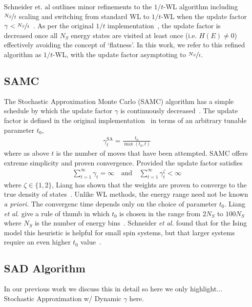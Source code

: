 \documentclass[letterpaper,twocolumn,amsmath,amssymb,pre,aps,10pt]{revtex4-1}
\begin{document}
Schneider $\text{et. al}$ outlines minor refinements to the $1/t$-WL algorithm
including $\nicefrac{N_S}{t}$ scaling and switching from standard WL to
$1/t$-WL when the update factor $\gamma <
\nicefrac{N_S}{t}$~\cite{schneider2017convergence}. As per the original
$1/t$ implementation~\cite{belardinelli2007fast}, the update factor is
decreased once all $N_S$ energy states are visited at least once (i.e.
$H(E) \neq 0$) effectively avoiding the concept of `flatness'.  In this
work, we refer to this refined algorithm as $1/t$-WL, with the update
factor asymptoting to $\nicefrac{N_S}{t}$.

\subsection{SAMC}
The Stochastic Approximation Monte Carlo (SAMC) algorithm has a simple
schedule by which the update factor $\gamma$ is continuously
decreased~\cite{liang2007stochastic, werlich2015stochastic,
schneider2017convergence}.  The update factor is defined in the
original implementation~\cite{liang2007stochastic} in terms of an
arbitrary tunable parameter $t_0$,
\begin{align}
\gamma_{t}^{\text{SA}} =\frac{t_0}{\max(t_0,t)}
\end{align}
where as above $t$ is the number of moves that have been attempted.
SAMC offers extreme simplicity and proven convergence.
Provided the update factor satisfies
\begin{align}
\sum_{t=1}^\infty \gamma_{t} = \infty \quad\textrm{and}\quad
\sum_{t=1}^\infty \gamma_{t}^\zeta < \infty
\end{align}
where $\zeta \in \{1,2\}$, Liang has shown that the weights are proven
to converge to the true density of states~\cite{liang2006theory,
liang2007stochastic}.  Unlike WL methods, the energy range need not be
known \emph{a priori.}  The convergenc time depends only on the choice of
parameter $t_0$.  Liang \emph{et al.} give a rule of thumb in
which $t_0$ is chosen in the range from $2N_S$ to $100N_S$ where $N_S$
is the number of energy bins~\cite{liang2007stochastic}.  Schneider
\emph{et al.} found that for the Ising model this heuristic is helpful
for small spin systems, but that larger systems require an even higher
$t_0$ value~\cite{schneider2017convergence}.

\subsection{SAD Algorithm}\label{sec:sad}
In our previous work we discuss this in detail so here we only highlight...
Stochastic Approximation w/ Dynamic $\gamma$ here.
\end{document}
